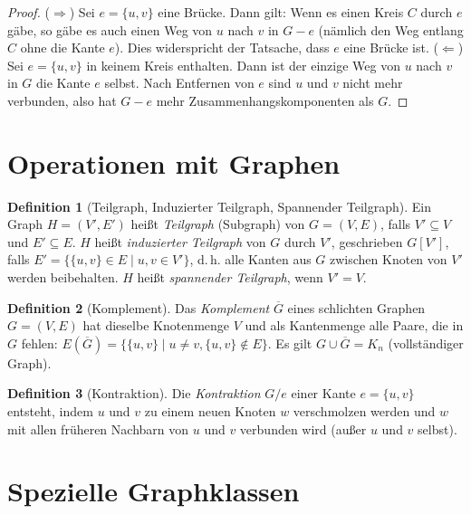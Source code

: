 ﻿\documentclass[a4paper,12pt,openany,oneside]{book}
\theoremstyle{definition}
\newtheorem{definition}{Definition}[chapter]
\theoremstyle{plain}
\theoremstyle{remark}
\begin{document}
\begin{proof}
  ($\Rightarrow$) Sei $e = \{u,v\}$ eine Br\"ucke. Dann gilt: Wenn es einen
  Kreis $C$ durch $e$ g\"abe, so g\"abe es auch einen Weg von $u$ nach $v$
  in $G - e$ (n\"amlich den Weg entlang $C$ ohne die Kante $e$). Dies
  widerspricht der Tatsache, dass $e$ eine Br\"ucke ist.
  ($\Leftarrow$) Sei $e = \{u,v\}$ in keinem Kreis enthalten. Dann ist der
  einzige Weg von $u$ nach $v$ in $G$ die Kante $e$ selbst. Nach Entfernen
  von $e$ sind $u$ und $v$ nicht mehr verbunden, also hat $G - e$ mehr
  Zusammenhangskomponenten als $G$.
\end{proof}

\section{Operationen mit Graphen}

\begin{definition}[Teilgraph, Induzierter Teilgraph, Spannender Teilgraph]
  Ein Graph $H = (V', E')$ hei\ss{}t \emph{Teilgraph} (Subgraph) von
  $G = (V,E)$, falls $V' \subseteq V$ und $E' \subseteq E$. $H$ hei\ss{}t
  \emph{induzierter Teilgraph} von $G$ durch $V'$, geschrieben $G[V']$, falls
  $E' = \{\{u,v\} \in E \mid u,v \in V'\}$, d.\,h. alle Kanten aus $G$
  zwischen Knoten von $V'$ werden beibehalten. $H$ hei\ss{}t
  \emph{spannender Teilgraph}, wenn $V' = V$.
\end{definition}

\begin{definition}[Komplement]
  Das \emph{Komplement} $\overline{G}$ eines schlichten Graphen $G = (V,E)$
  hat dieselbe Knotenmenge $V$ und als Kantenmenge alle Paare, die in $G$
  fehlen:
  $E(\overline{G}) = \bigl\{\{u,v\} \mid u \neq v, \{u,v\} \notin E\bigr\}.$
  Es gilt $G \cup \overline{G} = K_n$ (vollst\"andiger Graph).
\end{definition}

\begin{definition}[Kontraktion]
  Die \emph{Kontraktion} $G / e$ einer Kante $e = \{u,v\}$ entsteht, indem
  $u$ und $v$ zu einem neuen Knoten $w$ verschmolzen werden und $w$ mit allen
  fr\"uheren Nachbarn von $u$ und $v$ verbunden wird (au\ss{}er $u$ und $v$
  selbst).
\end{definition}

\section{Spezielle Graphklassen}
\end{document}
